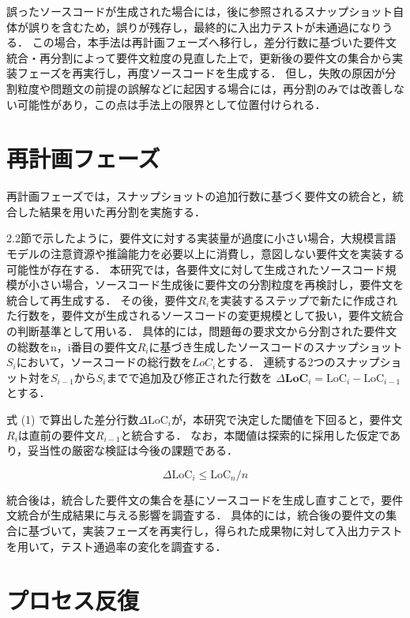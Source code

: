 \documentclass[11pt]{jreport}
\begin{document}
誤ったソースコードが生成された場合には，後に参照されるスナップショット自体が誤りを含むため，誤りが残存し，最終的に入出力テストが未通過になりうる．
この場合，本手法は再計画フェーズへ移行し，差分行数に基づいた要件文統合・再分割によって要件文粒度の見直した上で，更新後の要件文の集合から実装フェーズを再実行し，再度ソースコードを生成する．
但し，失敗の原因が分割粒度や問題文の前提の誤解などに起因する場合には，再分割のみでは改善しない可能性があり，この点は手法上の限界として位置付けられる．


\section{再計画フェーズ}
再計画フェーズでは，スナップショットの追加行数に基づく要件文の統合と，統合した結果を用いた再分割を実施する．

2.2節で示したように，要件文に対する実装量が過度に小さい場合，大規模言語モデルの注意資源や推論能力を必要以上に消費し，意図しない要件文を実装する可能性が存在する\cite{TOSEM}．
本研究では，各要件文に対して生成されたソースコード規模が小さい場合，ソースコード生成後に要件文の分割粒度を再検討し，要件文を統合して再生成する．
その後，要件文$R_i$を実装するステップで新たに作成された行数を，要件文が生成されるソースコードの変更規模として扱い，要件文統合の判断基準として用いる．
具体的には，問題毎の要求文から分割された要件文の総数をn，i番目の要件文$R_i$に基づき生成したソースコードのスナップショット$S_i$において，ソースコードの総行数を$LoC_i$とする．
連続する2つのスナップショット対を$S_{i-1}$から$S_i$までで追加及び修正された行数を $\Delta \mathbf{LoC}_i = \mathrm{LoC}_i − \mathrm{LoC}_{i-1}$ とする．

式 (1) で算出した差分行数$\Delta \mathrm{LoC}_i$が，本研究で決定した閾値を下回ると，要件文$R_i$は直前の要件文$R_{i−1}$と統合する．
なお，本閾値は探索的に採用した仮定であり，妥当性の厳密な検証は今後の課題である．

\begin{equation}
  \Delta \mathrm{LoC}_{i} \le \mathrm{LoC}_{n} / n
\end{equation}

統合後は，統合した要件文の集合を基にソースコードを生成し直すことで，要件文統合が生成結果に与える影響を調査する．
具体的には，統合後の要件文の集合に基づいて，実装フェーズを再実行し，得られた成果物に対して入出力テストを用いて，テスト通過率の変化を調査する．


\section{プロセス反復}
\end{document}
